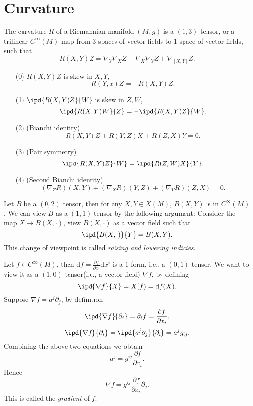 \section{Curvature}
\begin{definition}
  The curvature $R$ of a Riemannian manifold $(M,g)$ is a $(1,3)$ tensor, or a trilinear $C^\infty(M)$ map from 3 spaces of vector fields to 1 space of vector fields, such that 
  \begin{equation}
    R(X,Y)Z=\nabla _Y \nabla _X Z-\nabla _X\nabla _Y Z+\nabla _{[X,Y]}Z.
  \end{equation}
\end{definition}
\begin{proposition}
  \begin{itemize}
    \item [(0)] $R(X,Y)Z$ is skew in $X,Y$,
      \[
	R(Y,x)Z=-R(X,Y)Z.
      \] 
    \item [(1)] $\ipd{R(X,Y)Z}{W}$ is skew in $Z,W$,
      \[
	\ipd{R(X,Y)W}{Z}=-\ipd{R(X,Y)Z}{W}.
      \] 
    \item [(2)] (Bianchi identity)
      \[
	R(X,Y)Z+R(Y,Z)X+R(Z,X)Y=0.
      \] 
    \item [(3)] (Pair symmetry)
      \[
	\ipd{R(X,Y)Z}{W}=\ipd{R(Z,W)X}{Y}.
      \] 
    \item [(4)] (Second Bianchi identity)
      \[
	\left( \nabla _Z R\right)(X,Y)+(\nabla _X R)(Y,Z)+(\nabla _Y R)(Z,X)=0. 
      \] 
  \end{itemize}

\end{proposition}

Let $B$ be a $(0,2)$ tensor, then for any $X,Y\in X(M)$, $B(X,Y)$ is in $C^\infty(M)$. We can view $B$ as a $(1,1)$ tensor by the following argument:  Consider the map $X\mapsto B(X,\cdot )$, view $B(X,\cdot )$ as a vector field such that 
\[
  \ipd{B(X,\cdot )}{Y}=B(X,Y).
\] 
This change of viewpoint is called \textit{raising and lowering indicies}.

Let $f\in C^\infty(M)$, then $\mathrm{d}f= \frac{\partial f}{\partial x^i}\mathrm{d}x^i$ is a $1$-form, i.e., a $(0,1)$ tensor. We want to view it as a $(1,0)$ tensor(i.e., a vector field) $\nabla f$, by defining
\[
  \ipd{\nabla f}{X}=X(f)=\mathrm{d}f(X).
\] 
Suppose $\nabla f=a^j\partial_j$, by definition
\[
\ipd{\nabla f}{\partial_i}=\partial_if= \frac{\partial f}{\partial x_i}.
\]
\[
\ipd{\nabla  f}{\partial_i}=\ipd{a^j\partial_j}{\partial_i}=a^jg_{ij}.
\] 
Combining the above two equations we obtain
\[
a^j=g^{ij} \frac{\partial f}{\partial x_i}.
\]
Hence 
\begin{equation}
\nabla f = g^{ij} \frac{\partial f}{\partial x_i} \partial_j.
\end{equation}
This is called the  \textit{gradient} of $f$.

